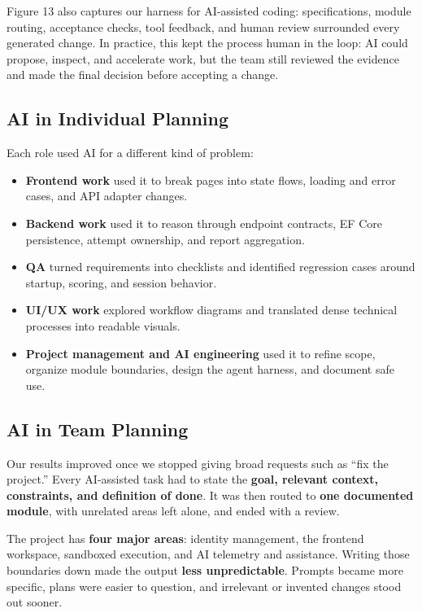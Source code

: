 \documentclass[11pt,a4paper]{article}
\begin{document}
Figure 13 also captures our harness for AI-assisted coding: specifications, module routing, acceptance checks, tool feedback, and human review surrounded every generated change. In practice, this kept the process human in the loop: AI could propose, inspect, and accelerate work, but the team still reviewed the evidence and made the final decision before accepting a change.

\subsection{AI in Individual Planning}

Each role used AI for a different kind of problem:

\begin{itemize}
  \item \textbf{Frontend work} used it to break pages into state flows, loading and error cases, and API adapter changes.
  \item \textbf{Backend work} used it to reason through endpoint contracts, EF Core persistence, attempt ownership, and report aggregation.
  \item \textbf{QA} turned requirements into checklists and identified regression cases around startup, scoring, and session behavior.
  \item \textbf{UI/UX work} explored workflow diagrams and translated dense technical processes into readable visuals.
  \item \textbf{Project management and AI engineering} used it to refine scope, organize module boundaries, design the agent harness, and document safe use.
\end{itemize}

\subsection{AI in Team Planning}

Our results improved once we stopped giving broad requests such as ``fix the project.'' Every AI-assisted task had to state the \textbf{goal, relevant context, constraints, and definition of done}. It was then routed to \textbf{one documented module}, with unrelated areas left alone, and ended with a review.

The project has \textbf{four major areas}: identity management, the frontend workspace, sandboxed execution, and AI telemetry and assistance. Writing those boundaries down made the output \textbf{less unpredictable}. Prompts became more specific, plans were easier to question, and irrelevant or invented changes stood out sooner.
\end{document}
